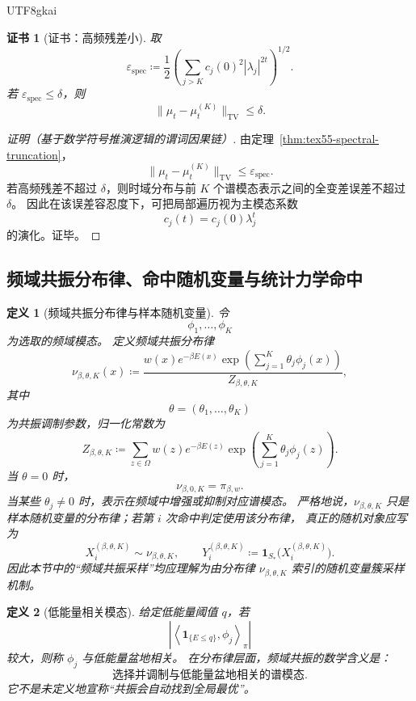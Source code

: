 \documentclass[12pt]{article}
\newtheorem{definition}{定义}[section]
\newtheorem{Certificate}{证书}[section]
\newcommand{\DefEq}{\coloneqq}
\newcommand{\TV}{\mathrm{TV}}
\begin{document}
\begin{CJK*}{UTF8}{gkai}
\begin{Certificate}[证书：高频残差小]
\label{cert:tex55-time-to-frequency}
取
\[
  \varepsilon_{\mathrm{spec}}
  \DefEq
  \frac12
  \left(
  \sum_{j>K}c_j(0)^2|\lambda_j|^{2t}
  \right)^{1/2}.
\]
若 \(\varepsilon_{\mathrm{spec}}\le\delta\)，则
\[
  \|\mu_t-\mu_t^{(K)}\|_{\TV}\le\delta.
\]
\end{Certificate}

\begin{proof}[证明（基于数学符号推演逻辑的谓词因果链）]
由定理~\ref{thm:tex55-spectral-truncation}，
\[
  \|\mu_t-\mu_t^{(K)}\|_{\TV}
  \le
  \varepsilon_{\mathrm{spec}}.
\]
若高频残差不超过 \(\delta\)，则时域分布与前 \(K\) 个谱模态表示之间的全变差误差不超过 \(\delta\)。
因此在该误差容忍度下，可把局部遍历视为主模态系数
\[
  c_j(t)=c_j(0)\lambda_j^t
\]
的演化。证毕。
\end{proof}

\subsection{频域共振分布律、命中随机变量与统计力学命中}
\label{subsec:tex55-resonance-hit}

\begin{definition}[频域共振分布律与样本随机变量]
\label{def:tex55-resonance-distribution}
令
\[
  \phi_1,\ldots,\phi_K
\]
为选取的频域模态。
定义频域共振分布律
\[
  \nu_{\beta,\theta,K}(x)
  \DefEq
  \frac{
  w(x)e^{-\beta E(x)}
  \exp\left(\sum_{j=1}^{K}\theta_j\phi_j(x)\right)
  }{
  Z_{\beta,\theta,K}
  },
\]
其中
\[
  \theta=(\theta_1,\ldots,\theta_K)
\]
为共振调制参数，归一化常数为
\[
  Z_{\beta,\theta,K}
  \DefEq
  \sum_{z\in\Omega}
  w(z)e^{-\beta E(z)}
  \exp\left(\sum_{j=1}^{K}\theta_j\phi_j(z)\right).
\]
当 \(\theta=0\) 时，
\[
  \nu_{\beta,0,K}=\pi_{\beta,w}.
\]
当某些 \(\theta_j\ne0\) 时，表示在频域中增强或抑制对应谱模态。
严格地说，\(\nu_{\beta,\theta,K}\) 只是样本随机变量的分布律；若第 \(i\) 次命中判定使用该分布律，
真正的随机对象应写为
\[
  X_i^{(\beta,\theta,K)}\sim \nu_{\beta,\theta,K},
  \qquad
  Y_i^{(\beta,\theta,K)}
  \DefEq
  \mathbf 1_{S_*}\bigl(X_i^{(\beta,\theta,K)}\bigr).
\]
因此本节中的“频域共振采样”均应理解为由分布律 \(\nu_{\beta,\theta,K}\) 索引的随机变量簇采样机制。
\end{definition}

\begin{definition}[低能量相关模态]
\label{def:tex55-low-energy-mode}
给定低能量阈值 \(q\)，若
\[
  \left|
  \left\langle
  \mathbf 1_{\{E\le q\}},
  \phi_j
  \right\rangle_{\pi}
  \right|
\]
较大，则称 \(\phi_j\) 与低能量盆地相关。
在分布律层面，频域共振的数学含义是：
\[
  \boxed{
  \text{选择并调制与低能量盆地相关的谱模态}
  }.
\]
它不是未定义地宣称“共振会自动找到全局最优”。
\end{definition}


\end{CJK*}
\end{document}
